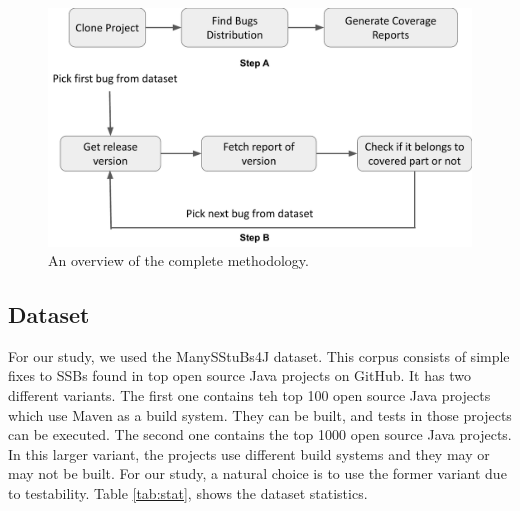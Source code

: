 \documentclass[sigconf,nonacm]{acmart}
\begin{document}
\begin{figure}[h]
	\centering
	\includegraphics[width=1.0\linewidth]{img/method.pdf}
	\caption{An overview of the complete methodology.}
	\label{fig:method_snap}
\end{figure}


\subsection{Dataset}
For our study, we used the ManySStuBs4J\cite{sstubs} dataset. This corpus consists of simple fixes to SSBs found in top open source Java projects on GitHub. It has two different variants. The first one contains teh top 100 open source Java projects which use Maven as a build system. They can be built, and tests in those projects can be executed. The second one contains the top 1000 open source Java projects. In this larger variant, the projects use different build systems and they may or may not be built. For our study, a natural choice is to use the former variant due to testability. Table \ref{tab:stat}, shows the dataset statistics.
\end{document}

